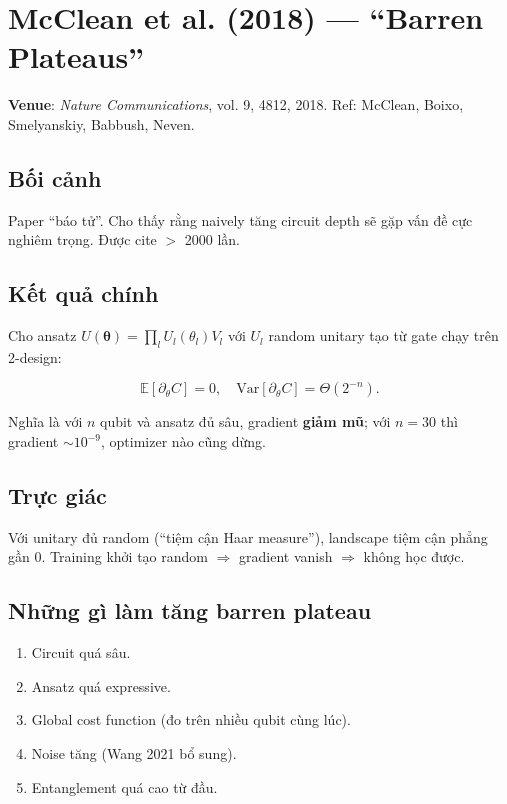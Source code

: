 \documentclass[11pt,a4paper]{article}
\begin{document}
\section{McClean et al. (2018) --- ``Barren Plateaus''}

\textbf{Venue}: \textit{Nature Communications}, vol. 9, 4812, 2018. Ref: McClean, Boixo, Smelyanskiy, Babbush, Neven.

\subsection{Bối cảnh}

Paper ``báo tử''. Cho thấy rằng naively tăng circuit depth sẽ gặp vấn đề cực nghiêm trọng. Được cite $>$ 2000 lần.

\subsection{Kết quả chính}

Cho ansatz $U(\boldsymbol{\theta}) = \prod_l U_l(\theta_l) V_l$ với $U_l$ random unitary tạo từ gate chạy trên 2-design:

\[
\mathbb{E}[\partial_\theta C] = 0, \quad \mathrm{Var}[\partial_\theta C] = \Theta(2^{-n}).
\]

Nghĩa là với $n$ qubit và ansatz đủ sâu, gradient \textbf{giảm mũ}; với $n = 30$ thì gradient $\sim 10^{-9}$, optimizer nào cũng dừng.

\subsection{Trực giác}

Với unitary đủ random (``tiệm cận Haar measure''), landscape tiệm cận phẳng gần 0. Training khởi tạo random $\Rightarrow$ gradient vanish $\Rightarrow$ không học được.

\subsection{Những gì làm tăng barren plateau}
\begin{enumerate}
  \item Circuit quá sâu.
  \item Ansatz quá expressive.
  \item Global cost function (đo trên nhiều qubit cùng lúc).
  \item Noise tăng (Wang 2021 bổ sung).
  \item Entanglement quá cao từ đầu.
\end{enumerate}
\end{document}

